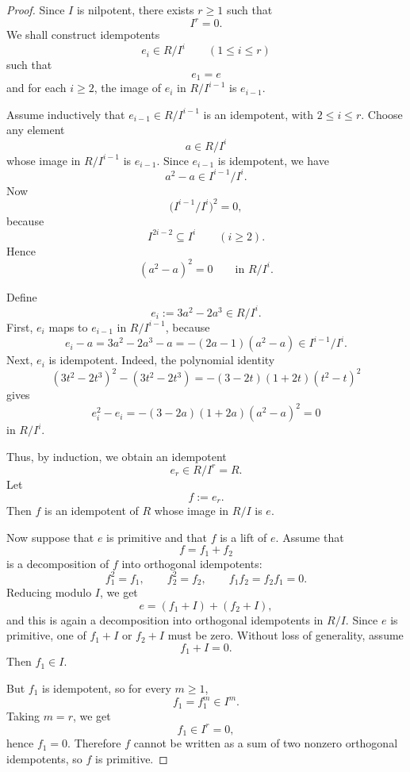 \begin{proof}
    Since $I$ is nilpotent, there exists $r\ge 1$ such that
    \[
        I^r=0.
    \]
    We shall construct idempotents
    \[
        e_i\in R/I^i \qquad (1\le i\le r)
    \]
    such that
    \[
        e_1=e
    \]
    and for each $i\ge 2$, the image of $e_i$ in $R/I^{i-1}$ is $e_{i-1}$.

    Assume inductively that $e_{i-1}\in R/I^{i-1}$ is an idempotent, with $2\le i\le r$.
    Choose any element
    \[
        a\in R/I^i
    \]
    whose image in $R/I^{i-1}$ is $e_{i-1}$.
    Since $e_{i-1}$ is idempotent, we have
    \[
        a^2-a\in I^{i-1}/I^i.
    \]
    Now
    \[
        \bigl(I^{i-1}/I^i\bigr)^2=0,
    \]
    because
    \[
        I^{2i-2}\subseteq I^i
        \qquad (i\ge 2).
    \]
    Hence
    \[
        (a^2-a)^2=0
        \qquad\text{in } R/I^i.
    \]

    Define
    \[
        e_i:=3a^2-2a^3\in R/I^i.
    \]
    First, $e_i$ maps to $e_{i-1}$ in $R/I^{i-1}$, because
    \[
        e_i-a
        =
        3a^2-2a^3-a
        =
        -(2a-1)(a^2-a)\in I^{i-1}/I^i.
    \]
    Next, $e_i$ is idempotent. Indeed, the polynomial identity
    \[
        (3t^2-2t^3)^2-(3t^2-2t^3)
        =
        -(3-2t)(1+2t)(t^2-t)^2
    \]
    gives
    \[
        e_i^2-e_i
        =
        -(3-2a)(1+2a)(a^2-a)^2=0
    \]
    in $R/I^i$.

    Thus, by induction, we obtain an idempotent
    \[
        e_r\in R/I^r=R.
    \]
    Let
    \[
        f:=e_r.
    \]
    Then $f$ is an idempotent of $R$ whose image in $R/I$ is $e$.

    \medskip

    Now suppose that $e$ is primitive and that $f$ is a lift of $e$.
    Assume that
    \[
        f=f_1+f_2
    \]
    is a decomposition of $f$ into orthogonal idempotents:
    \[
        f_1^2=f_1,\qquad f_2^2=f_2,\qquad f_1f_2=f_2f_1=0.
    \]
    Reducing modulo $I$, we get
    \[
        e=(f_1+I)+(f_2+I),
    \]
    and this is again a decomposition into orthogonal idempotents in $R/I$.
    Since $e$ is primitive, one of $f_1+I$ or $f_2+I$ must be zero.
    Without loss of generality, assume
    \[
        f_1+I=0.
    \]
    Then $f_1\in I$.

    But $f_1$ is idempotent, so for every $m\ge 1$,
    \[
        f_1=f_1^m\in I^m.
    \]
    Taking $m=r$, we get
    \[
        f_1\in I^r=0,
    \]
    hence $f_1=0$.
    Therefore $f$ cannot be written as a sum of two nonzero orthogonal idempotents, so $f$ is primitive.
\end{proof}

